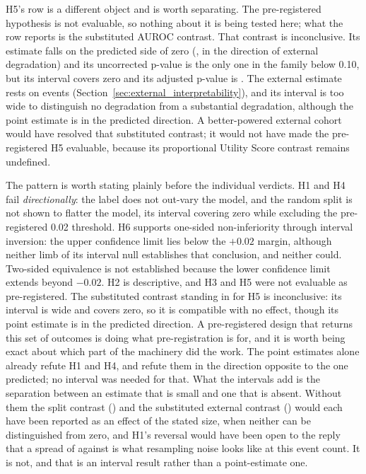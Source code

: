 H5's row is a different object and is worth separating. The pre-registered
hypothesis is not evaluable, so nothing about it is being tested here; what the
row reports is the substituted AUROC contrast. That contrast is inconclusive.
Its estimate falls on the predicted side of zero (\pcHFiveEst, in the direction
of external degradation) and its uncorrected p-value is the only one in the
family below 0.10, but its interval covers zero and its adjusted p-value is
\pcHFivePHolm. The external estimate rests on \pcExtNEventsB{} events
(Section~\ref{sec:external_interpretability}), and its interval is too wide to
distinguish no degradation from a substantial degradation, although the point
estimate is in the predicted direction. A
better-powered external cohort would have resolved that substituted contrast;
it would not have made the pre-registered H5 evaluable, because its
proportional Utility Score contrast remains undefined.

The pattern is worth stating plainly before the individual verdicts. H1 and H4
fail \emph{directionally}: the label does not out-vary the model, and the random
split is not shown to flatter the model, its interval covering zero while
excluding the pre-registered 0.02 threshold. H6 supports one-sided non-inferiority through
interval inversion: the upper confidence limit lies below the $+0.02$ margin,
although neither limb of its interval null establishes that conclusion, and
neither could.
Two-sided equivalence is not established because the lower confidence limit
extends beyond $-0.02$. H2 is descriptive, and H3 and
H5 were not evaluable as pre-registered. The substituted contrast standing in
for H5 is inconclusive: its interval is wide and covers zero, so it is
compatible with no effect, though its point estimate is in the predicted
direction. A pre-registered design that returns this set of outcomes is doing
what pre-registration is for, and it is worth being exact about which part of
the machinery did the work. The point estimates alone already refute H1 and H4,
and refute them in the direction opposite to the one predicted; no interval was
needed for that. What the intervals add is the separation between an estimate
that is small and one that is absent. Without them the split contrast
(\pcHFourEst) and the substituted external contrast (\pcHFiveEst) would each
have been reported as an effect of the stated size, when neither can be
distinguished from zero, and H1's reversal would have been open to the reply
that a spread of \pcSpreadLabel{} against \pcSpreadModelClass{} is what
resampling noise looks like at this event count. It is not, and that is an
interval result rather than a point-estimate one.

